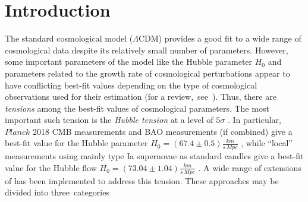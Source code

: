 \documentclass[universe,article,accept,moreauthors,pdftex]{Definitions/mdpi}
\begin{document}
\section{Introduction}\label{sec:I}



The standard cosmological model ($\Lambda$CDM) \cite{Planck:2018vyg,Planck:2018lkk,Planck:2018nkj,Planck:2019evm,Planck:2019kim,Planck:2019nip,Planck:2020qil} provides a good fit to
a wide range of cosmological data despite its relatively small number of parameters.
However, some important parameters of the model like the Hubble parameter $H_0$ and parameters related to the growth rate of cosmological perturbations appear to have conflicting best-fit values depending on the type of cosmological observations used for their estimation (for a \mbox{review, see \cite{Perivolaropoulos:2021jda}}). Thus, there are {\it tensions} among the best-fit values of \lcdm cosmological parameters. The most important such tension is the {\it Hubble tension} at a level of $5\sigma$ \cite{DiValentino:2020vnx}. In particular, $Planck$ 2018 CMB measurements and BAO measurements (if combined) give  a best-fit value for the Hubble parameter $H_{0}=(67.4\pm 0.5)\frac{km}{s\, {Mpc} 
}$ \cite{Planck:2018vyg}, while ``local'' measurements using mainly type Ia supernovae as standard candles \cite{Riess:2021jrx} give a best-fit value for the Hubble flow $H_{0}=(73.04\pm1.04)\frac{km}{s\, Mpc}$ \cite{DiValentino:2020vnx,Perivolaropoulos:2022khd,Perivolaropoulos:2021jda}. A wide range of extensions of \lcdm has been implemented to address this tension. These approaches may be divided into three~categories
\end{document}
